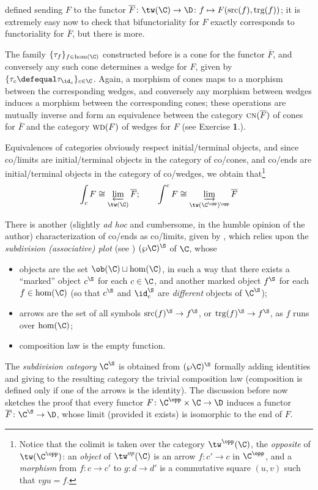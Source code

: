 defined sending $F$ to the functor $\overline F\colon \tw(\C)\to \D\colon f\mapsto F(\text{src}(f),\text{trg}(f))$; it is extremely easy now to check that bifunctoriality for $F$ exactly corresponds to functoriality for $\overline F$, but there is more.
\begin{remark}\label{is.a.colim}
The family $\{\tau_f\}_{f\in\hom(\C)}$ constructed before is a cone for the functor $\overline F$, and conversely any such cone determines a wedge for $F$, given by $\{\tau_c\defequal\tau_{\id_c}\}_{c\in \C}$. Again, a morphism of cones maps to a morphism between the corresponding wedges, and conversely any morphism between wedges induces a morphism between the corresponding cones; these operations are mutually inverse and form an equivalence between the category $\textsc{cn}(\overline F)$ of cones for $\overline F$ and the category $\textsc{wd}(F)$ of wedges for $F$ (see Exercise \textbf{1}.).
\end{remark}
Equivalences of categories obviously respect initial/terminal objects, and since co/limits are initial/terminal objects in the category of co/cones, and co/ends are initial/terminal objects in the category of co/wedges, we obtain that\footnote{Notice that the colimit is taken over the category $\tw^\opp(\C)$, the \emph{opposite} of $\tw(\C^\opp)$: an \emph{object} of $\tw^{op}(\C)$ is an arrow $f \colon c'\to c$ in $\C^\opp$, and a \emph{morphism} from $f \colon c\to c'$ to $g \colon d \to d'$ is a commutative square $(u,v)$ such that $vgu = f$.}
\[
\int_c F\cong \varprojlim_{\tw(\C)} \overline F; \qquad 
\int^c F\cong \varinjlim_{\tw(\C^\opp)^\opp} \overline F
\]
\begin{remark}
There is another (slightly \emph{ad hoc} and cumbersome, in the humble opinion of the author) characterization of co/ends as co/limits, given by \cite[Prop\@. \textbf{IX.5.1}]{McL}, which relies upon the \emph{subdivision (associative) plot} (see \cite[Def\@. \textbf{2}, \textbf{3}]{Salvo}) $(\wp \C)^\S$ of $\C$, whose
\begin{itemize}
\item objects are the set $\ob(\C)\sqcup\hom(\C)$, in such a way that there exists a ``marked'' object $c^\S$ for each $c\in\C$, and another marked object $f^\S$ for each $f\in\hom(\C)$ (so that $c^\S$ and $\id_c^\S$ are \emph{different} objects of $\C^\S$);
\item arrows are the set of all symbols $\text{src}(f)^\S\to f^\S$, or $\text{trg}(f)^\S\to f^\S$, as $f$ runs over $\hom(\C)$;
\item composition law is the empty function.
\end{itemize}
The \emph{subdivision category} $\C^\S$ is obtained from $(\wp \C)^\S$ formally adding identities and giving to the resulting category the trivial composition law (composition is defined only if one of the arrows is the identity). The discussion before \cite[Prop\@. \textbf{IX.5.1}]{McL} now sketches the proof that every functor $F\colon \C^\opp\times \C\to \D$ induces a functor $\overline F\colon\C^\S\to \D$, whose limit (provided it exists) is isomorphic to the end of $F$.
\end{remark}
